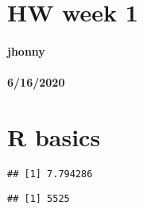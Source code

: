 \hypertarget{header}{}
\hypertarget{hw-week-1}{%
\section{HW week 1}\label{hw-week-1}}

\hypertarget{jhonny}{%
\paragraph{jhonny}\label{jhonny}}

\hypertarget{section}{%
\paragraph{6/16/2020}\label{section}}

\hypertarget{r-basics}{%
\section{R basics}\label{r-basics}}

\begin{Shaded}
\begin{Highlighting}[]
\StringTok{ }\NormalTok{(}\NormalTok{, }\NormalTok{, }\NormalTok{, }\NormalTok{, }\NormalTok{, }\NormalTok{, }\NormalTok{)}
\end{Highlighting}
\end{Shaded}

\begin{verbatim}
## [1] 7.794286
\end{verbatim}

\begin{Shaded}
\begin{Highlighting}[]
\StringTok{ }

 \OperatorTok{:}\NormalTok{) \{}
\StringTok{ }\OperatorTok{\^{}}
\NormalTok{\}}
\end{Highlighting}
\end{Shaded}

\begin{verbatim}
## [1] 5525
\end{verbatim}

